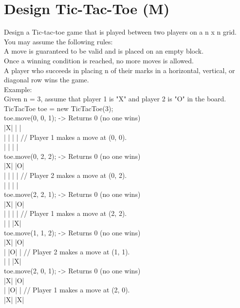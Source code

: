 \section{Design Tic-Tac-Toe (M)}
Design a Tic-tac-toe game that is played between two players on a n x n grid. \\

You may assume the following rules:\\
A move is guaranteed to be valid and is placed on an empty block.\\
Once a winning condition is reached, no more moves is allowed.\\
A player who succeeds in placing n of their marks in a horizontal, vertical, or diagonal row wins the game.\\

Example:\\
Given n = 3, assume that player 1 is "X" and player 2 is "O" in the board.\\
TicTacToe toe = new TicTacToe(3);\\

toe.move(0, 0, 1); -> Returns 0 (no one wins)\\
|X| | |\\
| | | | // Player 1 makes a move at (0, 0).\\
| | | |\\

toe.move(0, 2, 2); -> Returns 0 (no one wins)\\
|X| |O|\\
| | | | // Player 2 makes a move at (0, 2).\\
| | | |\\

toe.move(2, 2, 1); -> Returns 0 (no one wins)\\
|X| |O|\\
| | | | // Player 1 makes a move at (2, 2).\\
| | |X|\\

toe.move(1, 1, 2); -> Returns 0 (no one wins)\\
|X| |O|\\
| |O| | // Player 2 makes a move at (1, 1).\\
| | |X|\\

toe.move(2, 0, 1); -> Returns 0 (no one wins)\\
|X| |O|\\
| |O| | // Player 1 makes a move at (2, 0).\\
|X| |X|\\

